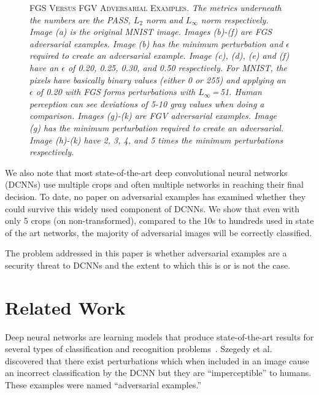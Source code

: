 \documentclass[conference]{IEEEtran}
\renewcommand\cap[3]{\caption[#2]{\label{#1}\textsc{#2}. \small\textit{#3}}}
\begin{document}
\begin{figure*}[t]
\cap{fig:fgs_fgv}{FGS Versus FGV Adversarial Examples}{The metrics underneath the numbers are the PASS, \(L_2\) norm and \(L_\infty\) norm respectively.  Image (a) is the original MNIST image.  Images (b)-(f) are FGS adversarial examples.  Image (b) has the minimum perturbation and \(\epsilon\) required to create an adversarial example.  Image (c), (d), (e) and (f) have an \(\epsilon\) of 0.20, 0.25, 0.30, and 0.50 respectively.  For MNIST, the pixels have basically binary values  (either 0 or 255) and applying an \(\epsilon\) of 0.20 with FGS forms perturbations with $L_\infty$\,=\,51.  Human perception can see deviations of 5-10 gray values when doing a comparison.  Images (g)-(k) are FGV adversarial examples.  Image (g) has the minimum perturbation required to create an adversarial.  Image (h)-(k) have 2, 3, 4, and 5 times the minimum perturbations respectively. }
\end{figure*}


We also note that most state-of-the-art deep convolutional neural networks (DCNNs) use multiple crops and often multiple networks in reaching their final decision.  To date, no paper on adversarial examples has examined whether they could survive this widely used component of DCNNs.  We show that even with only 5 crops (on non-transformed), compared to the 10s to hundreds used in state of the art networks,  the majority of adversarial images will be correctly classified.  \par
The problem addressed in this paper is whether adversarial examples are a security threat to DCNNs and the extent to which this is or is not the case.



\section{Related Work}

Deep neural networks are learning models that produce state-of-the-art results for several types of classification and recognition problems~\cite{c7,c8}. Szegedy et al.~\cite{c4} discovered that there exist perturbations which when included in an image cause an incorrect classification by the DCNN but they are ``imperceptible'' to humans.  These examples were named ``adversarial examples.'' 
\end{document}
